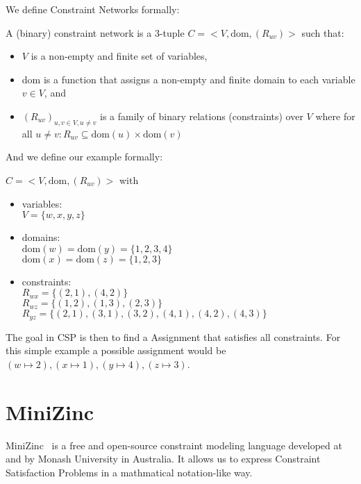We define Constraint Networks formally:

\begin{tcolorbox}
	A (binary) constraint network is a 3-tuple $C = <V, \text{dom}, (R_{uv})>$ such that:
	\begin{itemize}
		\item $V$ is a non-empty and finite set of variables,
		\item dom is a function that assigns a non-empty and finite domain to each variable $v \in V$, and
		\item $(R_{uv})_{u,v \in V, u \neq v}$ is a family of binary relations (constraints) over $V$ where for all $u \neq v: R_{uv} \subseteq \text{dom}(u) \times \text{dom}(v)$
	\end{itemize}
\end{tcolorbox}

And we define our example formally:

\begin{tcolorbox}
	$C = <V, \text{dom}, (R_{uv})>$ with
	\begin{itemize}
		\item variables: \\
		      $V = \{w, x, y, z\}$
		\item domains: \\
		      $\text{dom}(w) = \text{dom}(y) = \{1, 2, 3, 4\}$ \\
		      $\text{dom}(x) = \text{dom}(z) = \{1, 2, 3\}$
		\item constraints: \\
		      $R_{wx} = \{(2, 1), (4, 2)\}$ \\
		      $R_{wz} = \{(1, 2), (1, 3), (2, 3)\}$ \\
		      $R_{yz} = \{(2, 1), (3, 1), (3, 2), (4, 1), (4, 2), (4, 3)\}$ \\
	\end{itemize}
\end{tcolorbox}

The goal in CSP is then to find a Assignment that satisfies all constraints. For this simple example a possible assignment would be $(w \mapsto 2), (x \mapsto 1), (y \mapsto 4), (z \mapsto 3)$.

\section{MiniZinc}

MiniZinc~\cite{minizinc:2007} is a free and open-source constraint modeling language developed at and by Monash University in Australia. It allows us to express Constraint Satisfaction Problems in a mathmatical notation-like way.

